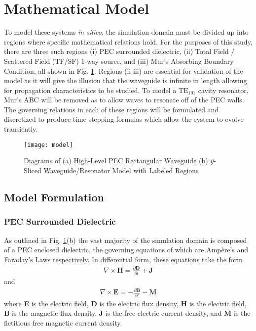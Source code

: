 \section{Mathematical Model}
\label{sec:mathmod}

To model these systems \textit{in silico}, the simulation domain must be divided up into regions where specific mathematical relations hold. For the purposes of this study, there are three such regions (i) PEC surrounded dielectric, (ii) Total Field / Scattered Field (TF/SF) 1-way source, and (iii) Mur's Absorbing Boundary Condition, all shown in Fig. \ref{fig:model}. Regions (ii-iii) are essential for validation of the model as it will give the illusion that the waveguide is infinite in length allowing for propagation characteristics to be studied. To model a $\mathrm{TE_{101}}$ cavity resonator, Mur's ABC will be removed as to allow waves to resonate off of the PEC walls. The governing relations in each of these regions will be formulated and discretized to produce time-stepping formulas which allow the system to evolve transiently.

\begin{figure}[h!]  
	\centering
	\texttt{[image: model]} 
	\caption{Diagrams of (a) High-Level PEC Rectangular Waveguide (b) $\hat{y}$-Sliced Waveguide/Resonator Model with Labeled Regions}
	\label{fig:model}
\end{figure}

\subsection{Model Formulation}
\label{subsec:model-formulation}

\subsubsection{PEC Surrounded Dielectric}
\label{subsec:dielectric-formulation}

As outlined in Fig. \ref{fig:model}(b) the vast majority of the simulation domain is composed of a PEC enclosed dielectric, the governing equations of which are Amp\`{e}re's and Faraday's Laws respectively. In differential form, these equations take the form 
\begin{align}
    \nabla\times\textbf{H} = \frac{\partial\textbf{D}}{\partial t} + \textbf{J}
    \label{eq:ampere}
\end{align}
and 
\begin{align}
    \nabla\times\textbf{E}=-\frac{\partial\textbf{B}}{\partial t} - \textbf{M}
    \label{eq:faraday}
\end{align}
where \textbf{E} is the electric field, \textbf{D} is the electric flux density, \textbf{H} is the electric field, \textbf{B} is the magnetic flux density, \textbf{J} is the free electric current density, and \textbf{M} is the fictitious free magnetic current density.

